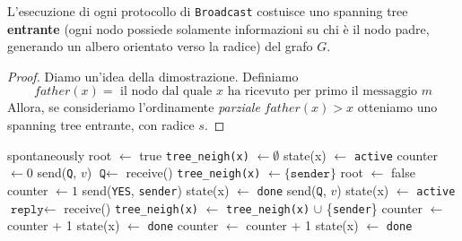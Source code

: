 \begin{teorema}
    L'esecuzione di ogni protocollo di \texttt{Broadcast} costuisce uno spanning tree \textbf{entrante} (ogni nodo possiede solamente informazioni su chi è il nodo padre, generando un albero orientato verso la radice) del grafo $G$.
    \begin{proof}
        Diamo un'idea della dimostrazione. Definiamo
        \[
        father(x) = \text{ il nodo dal quale } x \text{ ha ricevuto per primo il messaggio } m
        \]
        Allora, se consideriamo l'ordinamente \textit{parziale} $father(x) > x$ otteniamo uno spanning tree entrante, con radice $s$.
    \end{proof}
\end{teorema}

\begin{algorithm}[H]
\caption{Algoritmo di SHOUT}
    \begin{algorithmic}
     spontaneously
        \State root $\gets$ true
        \State \texttt{tree\_neigh(x)} $\gets \emptyset$
        \State state(x) $\gets$ \texttt{active}
        \State counter $\gets 0$
            \State send(\texttt{Q}, $v$)
        \EndFor
    \EndIf
    \State
        \State $\texttt{Q} \gets$ receive()
        \State \texttt{tree\_neigh(x)} $\gets \{ \texttt{sender} \}$
        \State root $\gets$ false
        \State counter $\gets 1$
        \State send(\texttt{YES}, \texttt{sender})
            \State state(x) $\gets$ \texttt{done}
        \Else        
                \State send($\texttt{Q}$, $v$)
            \EndFor
            \State state(x) $\gets$ \texttt{active}
        \EndIf
    \EndIf
    \State
        \State $\texttt{reply} \gets$ receive()
            \State \texttt{tree\_neigh(x)} $\gets$ \texttt{tree\_neigh(x)} $\cup$ \{\texttt{sender}\}
            \State counter $\gets$ counter + 1
                \State state(x) $\gets$ \texttt{done}
            \EndIf
        \EndIf
        \State
            \State counter $\gets$ counter + 1
                \State state(x) $\gets$ \texttt{done}
            \EndIf
        \EndIf
    \EndIf
    \end{algorithmic}
\end{algorithm}

